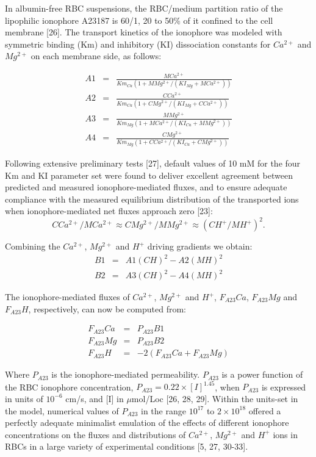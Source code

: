 \documentclass[a4paper]{article}
\newcommand{\med}[1]{M#1}
\newcommand{\cell}[1]{C#1}
\newcommand{\MCatp}{\med{Ca^{2+}}}
\newcommand{\MMgtp}{\med{Mg^{2+}}}
\newcommand{\MH}{\med{H}}
\newcommand{\Km}[1]{Km_{#1}}
\newcommand{\KI}[1]{KI_{#1}}
\newcommand{\CH}{\cell{H}}
\newcommand{\CMgtp}{\cell{Mg^{2+}}}
\newcommand{\CCatp}{\cell{Ca^{2+}}}
\newcommand{\F}[2]{F_{#1}#2}
\begin{document}
In albumin-free RBC suspensions, the RBC/medium partition ratio of the lipophilic ionophore A23187 is 60/1, 20 to 50\% of it confined to the cell membrane [26].  The transport kinetics of the ionophore was modeled with symmetric binding (Km) and inhibitory (KI) dissociation constants for $Ca^{2+}$ and $Mg^{2+}$ on each membrane side, as follows:


\begin{eqnarray}
\nonumber A1 &=& \frac{\MCatp}{\Km{Ca}(1 + \MMgtp/(\KI{Mg} + \MCatp))} \\
\nonumber A2 &=& \frac{\CCatp}{\Km{Ca}(1 + \CMgtp/(\KI{Mg} + \CCatp))}  \\
\nonumber A3 &=& \frac{\MMgtp}{\Km{Mg}(1 + \MCatp/(\KI{Ca} + \MMgtp))}  \\
\nonumber A4 &=& \frac{\CMgtp}{\Km{Mg}(1 + \CCatp/(\KI{Ca} + \CMgtp))} 
\end{eqnarray}

Following extensive preliminary tests [27], default values of 10 mM for the four Km and KI parameter set were found to deliver excellent agreement between predicted and measured ionophore-mediated fluxes, and to ensure adequate compliance with the measured equilibrium distribution of the transported ions when ionophore-mediated net fluxes approach zero [23]: 
\[\CCatp/\MCatp \approx \CMgtp/\MMgtp \approx (\CH^+/\MH^+)^2.\]

Combining the $Ca^{2+}$, $Mg^{2+}$ and $H^+$ driving gradients we obtain:
\begin{eqnarray}
\nonumber B1&=& A1(\CH)^2 - A2(\MH)^2 \\
\nonumber B2&=& A3(\CH)^2 - A4(\MH)^2
\end{eqnarray}

The ionophore-mediated fluxes of $Ca^{2+}$, $Mg^{2+}$ and $H^+$, $\F{A23}{Ca}$, $\F{A23}{Mg}$ and $\F{A23}{H}$, respectively, can now be computed from: 

\setcounter{equation}{0}
\renewcommand{\theequation}{A23-\arabic{equation}}

\begin{eqnarray}
\F{A23}{Ca} &=& P_{A23}B1 \\
\F{A23}{Mg} &=& P_{A23}B2 \\
\F{A23}{H} &=& -2(\F{A23}{Ca} + \F{A23}{Mg})
\end{eqnarray}

Where $P_{A23}$ is the ionophore-mediated permeability. $P_{A23}$ is a power function of the RBC ionophore concentration, $P_{A23} = 0.22\times [I]^{1.45}$, when $P_{A23}$ is expressed in units of $10^{-6}$ cm/s, and [I] in $\mu$mol/Loc [26, 28, 29]. Within the units-set in the model, numerical values of $P_{A23}$ in the range $10^{17}$ to $2\times10^{18}$ offered a perfectly adequate minimalist emulation of the effects of different ionophore concentrations on the fluxes and distributions of $Ca^{2+}$, $Mg^{2+}$ and $H^{+}$ ions in RBCs in a large variety of experimental conditions [5, 27, 30-33].    
\end{document}
